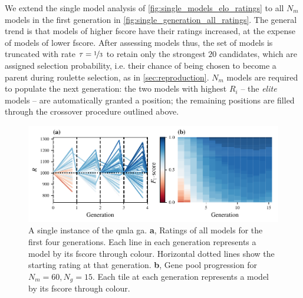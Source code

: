 {We extend the single model analysis of \cref{fig:single_models_elo_ratings} to all $N_m$ models 
    in the first generation in \cref{fig:single_generation_all_ratings}.
The general trend is that models of higher \gls{fscore} have their ratings increased, 
    at the expense of models of lower \gls{fscore}. 
After assessing models thus, the set of models is truncated with rate $\tau=\nicefrac{1}{3}$ to retain only 
    the strongest $20$ candidates,
    which are assigned selection probability, i.e. their chance of being chosen to become a parent during roulette selection, 
    as in \cref{sec:reproduction}.
$N_m$ models are required to populate the next generation:
    the two models with highest $R_i$ -- the \emph{elite} models -- are automatically granted a position;
    the remaining positions are filled through the crossover procedure outlined above.

\par 
\begin{figure}
    \begin{center}
        \includegraphics{theoretical_study/figures/gen_alg_instance_combined.pdf}
    \end{center}
    \caption[Instance of QMLA genetic algorithm]{
        A single \gls{instance} of the \gls{qmla} \acrlong{ga}.
        \textbf{a}, Ratings of all models for the first four generations. 
        Each line in each generation represents a model by its \gls{fscore} through colour. 
        Horizontal dotted lines show the starting rating at that generation. 
        \textbf{b}, Gene pool progression for $N_m=60, N_g=15$. 
        Each tile at each generation represents a model by its \gls{fscore} through colour. 
        \figtableref
    }
    \label{fig:ga_instance}
\end{figure}

}
